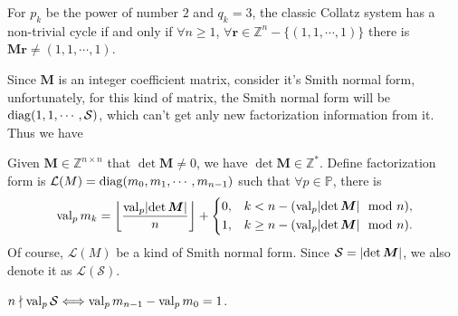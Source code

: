 \begin{example}\label{exa:collatz-cycle-system} 
	For $p_k$ be the power of number $2$ and $q_k = 3$, the classic Collatz system has a non-trivial cycle if and only if $\forall n \ge 1$, $\forall \bm{r} \in \mathbb{Z}^{n} - \{(1, 1, \cdots, 1)\}$ there is $\bm{M}\bm{r} \ne (1, 1, \cdots, 1)$.
\end{example}

Since $\bm{M}$ is an integer coefficient matrix, consider it's Smith normal form, unfortunately, for this kind of matrix, the Smith normal form will be $\operatorname{diag}(1, 1, \cdots, \mathcal{S})$, which can't get anly new factorization information from it. Thus we have
\begin{definition}
	Given $\bm{M}\in \mathbb{Z}^{n\times n}$ that $\det\bm{M} \ne 0$, we have $\det\bm{M} \in\mathbb{Z}^{*}$. Define factorization form is $\mathcal{L}(M) = \operatorname{diag}(m_0, m_1, \cdots, m_{n-1})$ such that $\forall p\in\mathbb{P}$, there is
	\[ \operatorname{val}_{p}m_k = \left\lfloor\frac{\operatorname{val}_{p}\lvert\det\bm{M}\rvert}{n}\right\rfloor + \left\{\begin{aligned}
		& 0, && k < n - (\operatorname{val}_{p}\lvert\det\bm{M}\rvert \mod{n}), \\
		& 1, && k \ge n - (\operatorname{val}_{p}\lvert\det\bm{M}\rvert \mod{n}).
	\end{aligned}\right. \]
	Of course, $\mathcal{L}(M)$ be a kind of Smith normal form. Since $\mathcal{S} = \lvert\det\bm{M}\rvert$, we also denote it as $\mathcal{L}(\mathcal{S})$.
\end{definition}
\begin{proposition}
	$n \nmid \operatorname{val}_{p}\mathcal{S} \Longleftrightarrow \operatorname{val}_{p}{m_{n-1}} - \operatorname{val}_{p}{m_{0}} = 1$.
\end{proposition}


